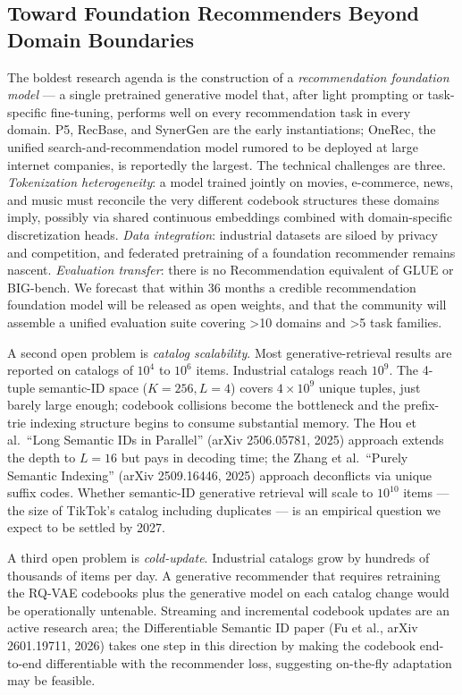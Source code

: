 \subsection{Toward Foundation Recommenders Beyond Domain Boundaries}\label{toward-foundation-recommenders-beyond-domain-boundaries}

The boldest research agenda is the construction of a \emph{recommendation foundation model} --- a single pretrained generative model that, after light prompting or task-specific fine-tuning, performs well on every recommendation task in every domain. P5, RecBase, and SynerGen are the early instantiations; OneRec, the unified search-and-recommendation model rumored to be deployed at large internet companies, is reportedly the largest. The technical challenges are three. \emph{Tokenization heterogeneity}: a model trained jointly on movies, e-commerce, news, and music must reconcile the very different codebook structures these domains imply, possibly via shared continuous embeddings combined with domain-specific discretization heads. \emph{Data integration}: industrial datasets are siloed by privacy and competition, and federated pretraining of a foundation recommender remains nascent. \emph{Evaluation transfer}: there is no Recommendation equivalent of GLUE or BIG-bench. We forecast that within 36 months a credible recommendation foundation model will be released as open weights, and that the community will assemble a unified evaluation suite covering \textgreater10 domains and \textgreater5 task families.

A second open problem is \emph{catalog scalability}. Most generative-retrieval results are reported on catalogs of \(10^4\) to \(10^6\) items. Industrial catalogs reach \(10^9\). The 4-tuple semantic-ID space (\(K=256, L=4\)) covers \(4 \times 10^9\) unique tuples, just barely large enough; codebook collisions become the bottleneck and the prefix-trie indexing structure begins to consume substantial memory. The Hou et al.~``Long Semantic IDs in Parallel'' (arXiv 2506.05781, 2025) approach extends the depth to \(L=16\) but pays in decoding time; the Zhang et al.~``Purely Semantic Indexing'' (arXiv 2509.16446, 2025) approach deconflicts via unique suffix codes. Whether semantic-ID generative retrieval will scale to \(10^{10}\) items --- the size of TikTok's catalog including duplicates --- is an empirical question we expect to be settled by 2027.

A third open problem is \emph{cold-update}. Industrial catalogs grow by hundreds of thousands of items per day. A generative recommender that requires retraining the RQ-VAE codebooks plus the generative model on each catalog change would be operationally untenable. Streaming and incremental codebook updates are an active research area; the Differentiable Semantic ID paper (Fu et al., arXiv 2601.19711, 2026) takes one step in this direction by making the codebook end-to-end differentiable with the recommender loss, suggesting on-the-fly adaptation may be feasible.

